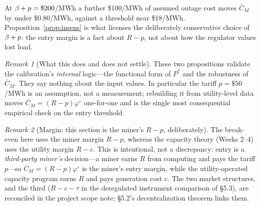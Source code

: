 \documentclass[11pt,reqno]{amsart}
\theoremstyle{plain}\newtheorem{proposition}{Proposition}\newtheorem{corollary}[proposition]{Corollary}
\theoremstyle{remark}\newtheorem{remark}[proposition]{Remark}
\newcommand{\phio}{\varphi^{\circ}}\newcommand{\CMbar}{\bar C_M}\newcommand{\eqdef}{\vcentcolon=}
\begin{document}
At $\beta+p=\$200$/MWh a further \$100/MWh of assumed outage cost moves $\CMbar$ by under
\$0.80/MWh, against a threshold near \$18/MWh. Proposition~\ref{prop:insens} is what
licenses the deliberately conservative choice of $\beta+p$: the entry margin is a fact about
$R-p$, not about how the regulator values lost load.

\begin{remark}[What this does and does not settle]
These two propositions validate the calibration's \emph{internal} logic---the functional
form of $P^{*}$ and the robustness of $\CMbar$. They say nothing about the input values.
In particular the tariff $p=\$50$/MWh is an assumption, not a measurement; rebuilding it
from utility-level data moves $\CMbar=(R-p)\phio$ one-for-one and is the single most
consequential empirical check on the entry threshold.
\end{remark}

\begin{remark}[Margin: this section is the miner's $R-p$, deliberately]
The break-even here uses the miner margin $R-p$, whereas the capacity theory (Weeks 2--4)
uses the utility margin $R-c$. This is intentional, not a discrepancy: entry is a
\emph{third-party miner's} decision---a miner earns $R$ from computing and pays the tariff
$p$---so $\CMbar=(R-p)\phio$ is the miner's entry margin, while the utility-operated capacity
program earns $R$ and pays generation cost $c$. The two market structures, and the third
($R-c-\tau$ in the deregulated instrument comparison of \S5.3), are reconciled in the
project scope note; \S5.2's decentralization theorem links them.
\end{remark}
\end{document}
